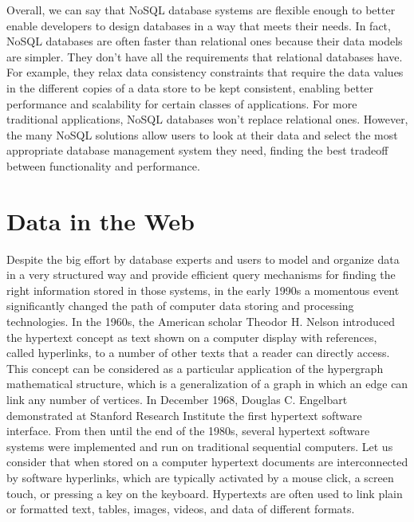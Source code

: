 Overall, we can say that NoSQL database systems are flexible enough to better enable developers to design databases in a way that meets their needs. In fact, NoSQL databases are often faster than relational ones because their data models are simpler. They don't have all the requirements that relational databases have. For example, they relax data consistency constraints that require the data values in the different copies of a data store to be kept consistent, enabling better performance and scalability for certain classes of applications. For more traditional applications, NoSQL databases won't replace relational ones. However, the many NoSQL solutions allow users to look at their data and select the most \hbox{appropriate} database management system they need, finding the best tradeoff between functionality and performance.

\section{\label{sec:3.4}Data in the Web}

Despite the big effort by database experts and users to model and organize data in a very structured way and provide efficient query mechanisms for finding the right information stored in those systems, in the early 1990s a momentous event significantly changed the path of computer data storing and processing technologies. In the 1960s, the American scholar Theodor H. Nelson introduced the hypertext concept as text shown on a computer display with references, called hyperlinks, to a number of other texts that a reader can directly access. This concept can be considered as a particular application of the hypergraph mathematical structure, which is a generalization of a graph in which an edge can link any number of vertices. In December 1968, Douglas C. Engelbart demonstrated at Stanford Research Institute the first hypertext software interface. From then until the end of the 1980s, several hypertext software systems were implemented and run on traditional sequential computers. Let us consider that when stored on a computer hypertext documents are interconnected by software hyperlinks, which are typically activated by a mouse click, a screen touch, or pressing a key on the keyboard. Hypertexts are often used to link plain or formatted text, tables, images, videos, and data of different formats.

